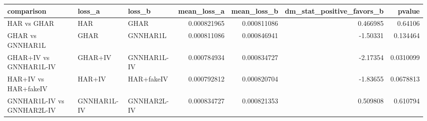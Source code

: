 \begin{tabular}{lllrrrr}
\toprule
comparison & loss_a & loss_b & mean_loss_a & mean_loss_b & dm_stat_positive_favors_b & pvalue \\
\midrule
HAR vs GHAR & HAR & GHAR & 0.000821965 & 0.000811086 & 0.466985 & 0.64106 \\
GHAR vs GNNHAR1L & GHAR & GNNHAR1L & 0.000811086 & 0.000846941 & -1.50331 & 0.134464 \\
GHAR+IV vs GNNHAR1L-IV & GHAR+IV & GNNHAR1L-IV & 0.000784934 & 0.000834727 & -2.17354 & 0.0310099 \\
HAR+IV vs HAR+fakeIV & HAR+IV & HAR+fakeIV & 0.000792812 & 0.000820704 & -1.83655 & 0.0678813 \\
GNNHAR1L-IV vs GNNHAR2L-IV & GNNHAR1L-IV & GNNHAR2L-IV & 0.000834727 & 0.000821353 & 0.509808 & 0.610794 \\
\bottomrule
\end{tabular}
